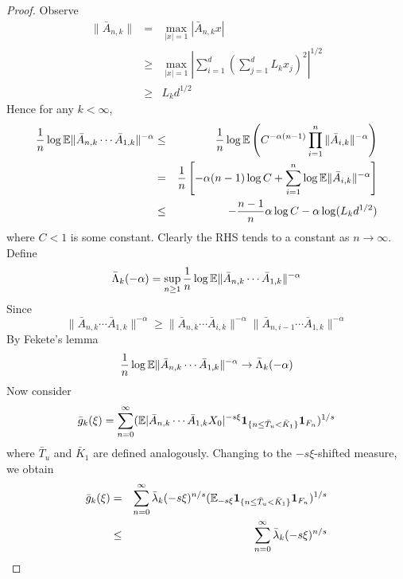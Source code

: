 \documentclass[aoas,preprint]{imsart}
\numberwithin{equation}{section}
\theoremstyle{plain}
\begin{document}
\begin{proof}
  Observe
  \begin{eqnarray*}
    \|\bar A_{n,k}\|
    &=&
    \max_{|x| = 1} |\bar A_{n,k} x| \\
    &\geq&
    \max_{|x| = 1}
    \left|
      \sum_{i=1}^d \left(\sum_{j=1}^d L_k x_j \right)^2
    \right|^{1/2} \\
    &\geq& L_k d^{1/2}
  \end{eqnarray*}
  Hence for any $k < \infty$,
  \begin{eqnarray*}
    {1 \over n}
    \log \mathbb{E}
    \|\bar A_{n,k} \cdots \bar A_{1,k}\|^{-\alpha}
    &\leq&
    {1 \over n} \log \mathbb{E} \left(
      C^{-\alpha(n-1)} \prod_{i=1}^n \|\bar A_{i,k}\|^{-\alpha}
    \right) \\
    &=& {1 \over n} \left[
      -\alpha(n-1) \log C
      + \sum_{i=1}^n \log \mathbb{E} \|\bar A_{i,k}\|^{-\alpha}
    \right] \\
    &\leq&
    -{n - 1 \over n} \alpha \log C
    -\alpha \log (L_k d^{1/2})
  \end{eqnarray*}
  where $C < 1$ is some constant. Clearly the RHS tends to a constant
  as $n \to \infty$. Define
  \begin{equation*}
    \bar \Lambda_{k}(-\alpha) = \sup_{n \geq 1} {1 \over n} \log
    \mathbb{E}\|\bar A_{n,k} \cdots \bar A_{1,k}\|^{-\alpha}
  \end{equation*}
  Since
  \begin{equation*}
    \|\bar A_{n,k} \cdots \bar A_{1,k}\|^{-\alpha}
    \geq
    \|\bar A_{n,k} \cdots \bar A_{i,k}\|^{-\alpha}
    \|\bar A_{n,i-1} \cdots \bar A_{1,k}\|^{-\alpha}
  \end{equation*}
  By Fekete's lemma
  \begin{equation*}
    {1 \over n} \log \mathbb{E} \|\bar A_{n,k} \cdots \bar A_{1,k}\|^{-\alpha}
    \to
    \bar \Lambda_{k}(-\alpha)
  \end{equation*}
  Now consider
  \begin{eqnarray*}
    \bar g_k(\xi) = \sum_{n=0}^\infty
    (\mathbb{E} |\bar A_{n,k} \cdots \bar A_{1,k} X_0|^{-s\xi}
    \mathbf{1}_{\{n \leq \bar T_u < \bar K_1\}}
    \mathbf{1}_{F_n}
    )^{1/s}
  \end{eqnarray*}
  where $\bar T_u$ and $\bar K_1$ are defined analogously. Changing
  to the $-s\xi$-shifted measure, we obtain
  \begin{eqnarray*}
    \bar g_k(\xi) &=& \sum_{n=0}^\infty \bar \lambda_{k}(-s\xi)^{n/s}
    (\E_{-s\xi} \1{n \leq \bar T_u < \bar K_1} \I_{F_n})^{1/s} \\
    &\leq&
    \sum_{n=0}^\infty \bar \lambda_{k}(-s\xi)^{n/s}

\end{eqnarray*}
\end{proof}
\end{document}
